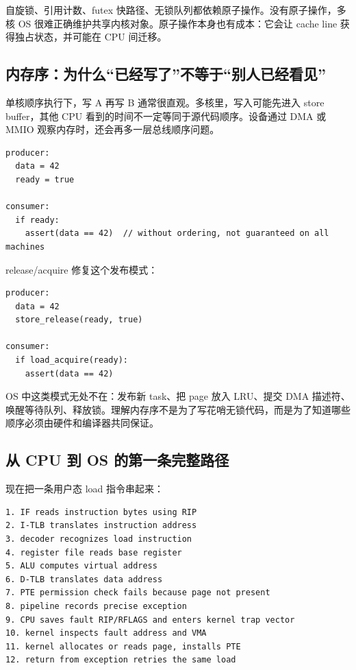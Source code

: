 自旋锁、引用计数、futex 快路径、无锁队列都依赖原子操作。没有原子操作，多核 OS 很难正确维护共享内核对象。原子操作本身也有成本：它会让 cache line 获得独占状态，并可能在 CPU 间迁移。

\subsection{内存序：为什么“已经写了”不等于“别人已经看见”}

单核顺序执行下，写 A 再写 B 通常很直观。多核里，写入可能先进入 store buffer，其他 CPU 看到的时间不一定等同于源代码顺序。设备通过 DMA 或 MMIO 观察内存时，还会再多一层总线顺序问题。

\begin{lstlisting}
producer:
  data = 42
  ready = true

consumer:
  if ready:
    assert(data == 42)  // without ordering, not guaranteed on all machines
\end{lstlisting}

release/acquire 修复这个发布模式：

\begin{lstlisting}
producer:
  data = 42
  store_release(ready, true)

consumer:
  if load_acquire(ready):
    assert(data == 42)
\end{lstlisting}

OS 中这类模式无处不在：发布新 task、把 page 放入 LRU、提交 DMA 描述符、唤醒等待队列、释放锁。理解内存序不是为了写花哨无锁代码，而是为了知道哪些顺序必须由硬件和编译器共同保证。

\subsection{从 CPU 到 OS 的第一条完整路径}

现在把一条用户态 load 指令串起来：

\begin{lstlisting}
1. IF reads instruction bytes using RIP
2. I-TLB translates instruction address
3. decoder recognizes load instruction
4. register file reads base register
5. ALU computes virtual address
6. D-TLB translates data address
7. PTE permission check fails because page not present
8. pipeline records precise exception
9. CPU saves fault RIP/RFLAGS and enters kernel trap vector
10. kernel inspects fault address and VMA
11. kernel allocates or reads page, installs PTE
12. return from exception retries the same load
\end{lstlisting}

